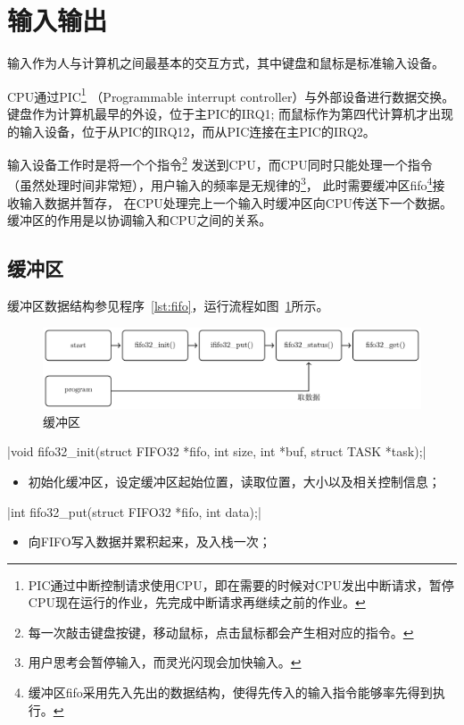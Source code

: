 \section{输入输出}
输入作为人与计算机之间最基本的交互方式，其中键盘和鼠标是标准输入设备。

CPU通过PIC\footnote{PIC通过中断控制请求使用CPU，即在需要的时候对CPU发出中断请求，暂停CPU现在运行的作业，先完成中断请求再继续之前的作业。}
（Programmable interrupt controller）与外部设备进行数据交换。
键盘作为计算机最早的外设，位于主PIC的IRQ1;
而鼠标作为第四代计算机才出现的输入设备，位于从PIC的IRQ12，而从PIC连接在主PIC的IRQ2。

输入设备工作时是将一个个指令\footnote{每一次敲击键盘按键，移动鼠标，点击鼠标都会产生相对应的指令。}
发送到CPU，而CPU同时只能处理一个指令（虽然处理时间非常短），用户输入的频率是无规律的\footnote{用户思考会暂停输入，而灵光闪现会加快输入。}，
此时需要缓冲区fifo\footnote{缓冲区fifo采用先入先出的数据结构，使得先传入的输入指令能够率先得到执行。}接收输入数据并暂存，
在CPU处理完上一个输入时缓冲区向CPU传送下一个数据。缓冲区的作用是以协调输入和CPU之间的关系。

\subsection{缓冲区}

缓冲区数据结构参见程序~\ref{lst:fifo}，运行流程如图~\ref{fig:fifo}所示。

\begin{figure}[H]
    \centering
    \includegraphics[width=\textwidth]{../Fig/func/fifo.pdf}
    \caption{缓冲区}
    \label{fig:fifo}
\end{figure}

\csingle|void fifo32_init(struct FIFO32 *fifo, int size, int *buf, struct TASK *task);|
\begin{itemize}
  \item 初始化缓冲区，设定缓冲区起始位置，读取位置，大小以及相关控制信息；
\end{itemize}

\csingle|int fifo32_put(struct FIFO32 *fifo, int data);|
\begin{itemize}
  \item 向FIFO写入数据并累积起来，及入栈一次；
\end{itemize}

